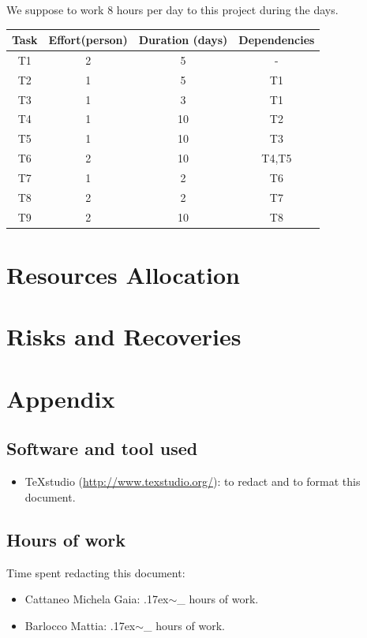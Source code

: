 \documentclass[18pt,oneside,a4paper, titlepage]{article}
\begin{document}
	We suppose to work 8 hours per day to this project during the days.
	\begin{center}
		\centering
		\begin{tabular}{|c |c |c | c|}
			\hline \textbf{Task} & \textbf{Effort(person)} &\textbf{Duration (days)} & \textbf{Dependencies} \\
			\hline		T1 & 2 & 5 & -\\
			\hline		T2 & 1 & 5 & T1\\
			\hline		T3 & 1 & 3 & T1\\
			\hline		T4 & 1 & 10 & T2\\
			\hline		T5 & 1 & 10 & T3\\
			\hline		T6 & 2 & 10 & T4,T5\\
			\hline		T7 & 1 & 2 & T6\\
			\hline		T8 & 2 & 2 & T7\\
			\hline		T9 & 2 & 10 & T8\\
			\hline
		\end{tabular}
	\end{center}
	
\newpage
\section{Resources Allocation}

\newpage
\section{Risks and Recoveries}

\newpage
\section{Appendix}

	\subsection{Software and tool used}
		\begin{itemize}
			\item TeXstudio (\url{http://www.texstudio.org/}): to redact and to format this document.
		\end{itemize}
	
	\subsection{Hours of work}
		Time spent redacting this document:
		\begin{itemize}
			\item Cattaneo Michela Gaia: {\raise.17ex\hbox{$\scriptstyle\sim$}}\_ hours of work.
			\item Barlocco Mattia: {\raise.17ex\hbox{$\scriptstyle\sim$}}\_ hours of work.
		\end{itemize}
\end{document}
